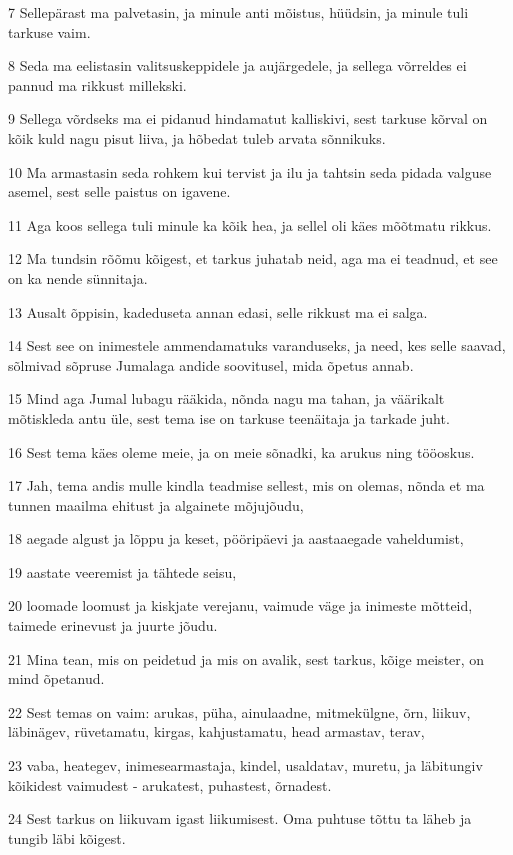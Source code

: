 \par 7 Sellepärast ma palvetasin, ja minule anti mõistus, hüüdsin, ja minule tuli tarkuse vaim.
\par 8 Seda ma eelistasin valitsuskeppidele ja aujärgedele, ja sellega võrreldes ei pannud ma rikkust millekski.
\par 9 Sellega võrdseks ma ei pidanud hindamatut kalliskivi, sest tarkuse kõrval on kõik kuld nagu pisut liiva, ja hõbedat tuleb arvata sõnnikuks.
\par 10 Ma armastasin seda rohkem kui tervist ja ilu ja tahtsin seda pidada valguse asemel, sest selle paistus on igavene.
\par 11 Aga koos sellega tuli minule ka kõik hea, ja sellel oli käes mõõtmatu rikkus.
\par 12 Ma tundsin rõõmu kõigest, et tarkus juhatab neid, aga ma ei teadnud, et see on ka nende sünnitaja.
\par 13 Ausalt õppisin, kadeduseta annan edasi, selle rikkust ma ei salga.
\par 14 Sest see on inimestele ammendamatuks varanduseks, ja need, kes selle saavad, sõlmivad sõpruse Jumalaga andide soovitusel, mida õpetus annab.
\par 15 Mind aga Jumal lubagu rääkida, nõnda nagu ma tahan, ja väärikalt mõtiskleda antu üle, sest tema ise on tarkuse teenäitaja ja tarkade juht.
\par 16 Sest tema käes oleme meie, ja on meie sõnadki, ka arukus ning tööoskus.
\par 17 Jah, tema andis mulle kindla teadmise sellest, mis on olemas, nõnda et ma tunnen maailma ehitust ja algainete mõjujõudu,
\par 18 aegade algust ja lõppu ja keset, pööripäevi ja aastaaegade vaheldumist,
\par 19 aastate veeremist ja tähtede seisu,
\par 20 loomade loomust ja kiskjate verejanu, vaimude väge ja inimeste mõtteid, taimede erinevust ja juurte jõudu.
\par 21 Mina tean, mis on peidetud ja mis on avalik, sest tarkus, kõige meister, on mind õpetanud.
\par 22 Sest temas on vaim: arukas, püha, ainulaadne, mitmekülgne, õrn, liikuv, läbinägev, rüvetamatu, kirgas, kahjustamatu, head armastav, terav,
\par 23 vaba, heategev, inimesearmastaja, kindel, usaldatav, muretu, ja läbitungiv kõikidest vaimudest - arukatest, puhastest, õrnadest.
\par 24 Sest tarkus on liikuvam igast liikumisest. Oma puhtuse tõttu ta läheb ja tungib läbi kõigest.
